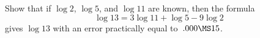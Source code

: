 Show that if $\log 2$, $\log 5$, and $\log 11$ are known, then the formula
\[
\log 13 = 3\log 11 + \log 5 - 9\log 2
\]
gives $\log 13$ with an error practically equal to~$.000\MS15$. 

